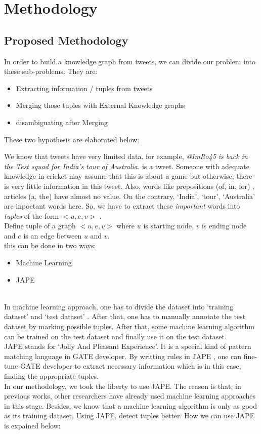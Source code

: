\chapter{Methodology}\label{ch4}

\section{Proposed Methodology}
In order to build a knowledge graph from tweets, we can divide our problem into these sub-problems. They are:
\begin{itemize}
\item Extracting information / tuples from tweets 
\item Merging those tuples with External Knowledge graphs
\item disambiguating after Merging 
\end{itemize} 
These two hypothesis are elaborated below: 

We know that tweets have very limited data. for example, 
\textit{ @ImRo45 is back in the Test squad for India’s tour of Australia. } is a tweet. Someone with adequate knowledge in cricket
may assume that this is about a game but otherwise, there is very little information in this tweet. 
Also, words like prepositions (of, in, for) , articles (a, the) have almost no value. On the contrary, `India', `tour', `Australia' 
are inpoetant words here. 
So, we have to extract these \textit{ important } words into \textit{ tuples } of the form $<u, e, v>$ . \\
 Define tuple of a graph $<u, e, v>$ where $ u $ is starting node, $ v $ is ending node and $ e $ is an edge between $ u $ and $v $. \\

this can be done in two ways: 
\begin{itemize}
\item Machine Learning 
\item JAPE 
\end{itemize} 
\\
In machine learning approach, one has to divide the dataset into `training dataset'  and `test dataset' . 
After that, one has to manually annotate the test dataset by marking possible tuples. After that, some machine learning algorithm
 can be trained on the test dataset and finally use it on the test dataset. 
\\ 
JAPE stands for `Jolly And Pleasant Experience'. It is a special kind of pattern matching language in GATE developer. 
By writting rules in JAPE , one can fine-tune GATE developer to extract necessary information which is in this case, 
finding the appropriate tuples. 
\\ 
In our methodology, we took the liberty to use JAPE. The reason is that, in previous works, other researchers  
 have already used machine learning approaches in this stage. Besides, we know 
that a machine learning algorithm is only as good as its training dataset. Using JAPE, detect tuples 
better. How we can use JAPE is expained below: 

